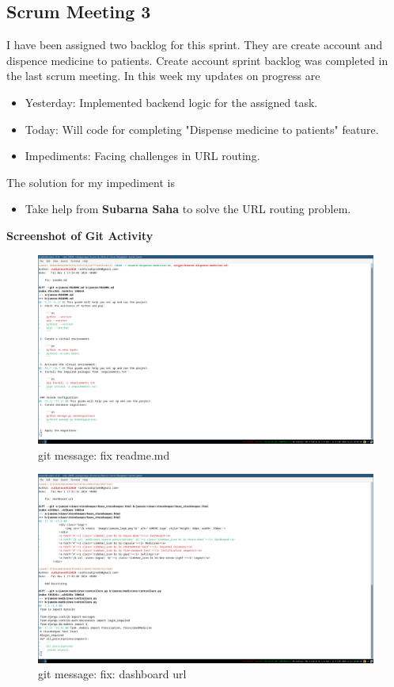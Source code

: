 \documentclass[a4paper,12pt]{article}
\begin{document}
\subsection{Scrum Meeting 3}
I have been assigned two backlog for this sprint. They are create account and dispence medicine to patients.
Create account sprint backlog was completed in the last scrum meeting. In this week my updates on progress are
\begin{itemize}
    \item Yesterday: Implemented backend logic for the assigned task.
    \item Today: Will code for completing "Dispense medicine to patients" feature.
    \item Impediments: Facing challenges in URL routing.
\end{itemize}
The solution for my impediment is
\begin{itemize}
    \item Take help from \textbf{Subarna Saha} to solve the URL routing problem.
\end{itemize}
\textbf{\large{Screenshot of Git Activity}}
\begin{figure}[H]
    \centering
    \includegraphics[width=\textwidth]{images/spr1meet31.png}
    \caption{git message: fix readme.md}
\end{figure}
\begin{figure}[H]
    \centering
    \includegraphics[width=\textwidth]{images/spr1meet32.png}
    \caption{git message: fix: dashboard url}
\end{figure}
\end{document}
